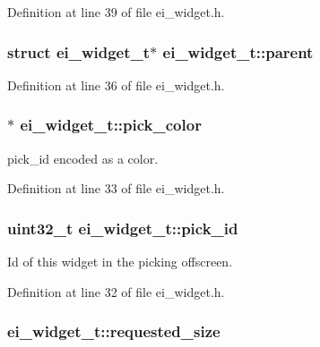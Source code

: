 Definition at line 39 of file ei\-\_\-widget.\-h.

\hypertarget{structei__widget__t_adb1b43eda89c8e86d6337c939f1a4473}{
\subsubsection[{parent}]{\setlength{\rightskip}{0pt plus 5cm}struct {\bf ei\-\_\-widget\-\_\-t}$\ast$ ei\-\_\-widget\-\_\-t\-::parent}}\label{structei__widget__t_adb1b43eda89c8e86d6337c939f1a4473}


Definition at line 36 of file ei\-\_\-widget.\-h.

\hypertarget{structei__widget__t_ad1477adf8e6b5cb6a5f11f657fe4781b}{
\subsubsection[{pick\-\_\-color}]{$\ast$ ei\-\_\-widget\-\_\-t\-::pick\-\_\-color}}\label{structei__widget__t_ad1477adf8e6b5cb6a5f11f657fe4781b}


pick\-\_\-id encoded as a color. 



Definition at line 33 of file ei\-\_\-widget.\-h.

\hypertarget{structei__widget__t_ada7ce878377d653d930a57e175b61182}{
\subsubsection[{pick\-\_\-id}]{\setlength{\rightskip}{0pt plus 5cm}uint32\-\_\-t ei\-\_\-widget\-\_\-t\-::pick\-\_\-id}}\label{structei__widget__t_ada7ce878377d653d930a57e175b61182}


Id of this widget in the picking offscreen. 



Definition at line 32 of file ei\-\_\-widget.\-h.

\hypertarget{structei__widget__t_ae82b19958b3ec72a855986dffb9b92ea}{
\subsubsection[{requested\-\_\-size}]{ ei\-\_\-widget\-\_\-t\-::requested\-\_\-size}}\label{structei__widget__t_ae82b19958b3ec72a855986dffb9b92ea}


